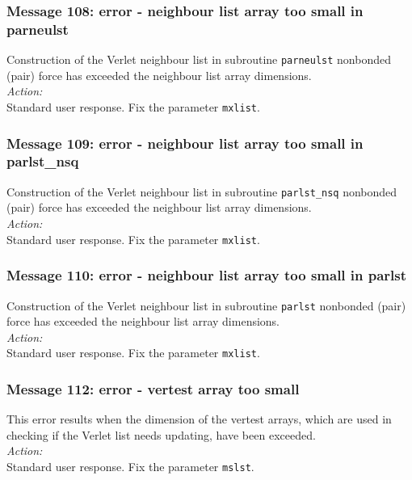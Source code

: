 \subsubsection*{Message 108: error - neighbour list array too small in
          parneulst}

Construction of the Verlet neighbour list 
in subroutine {\tt parneulst} nonbonded (pair) force has exceeded the
neighbour list array dimensions. \\

\noindent
{\em Action:} \\ 
Standard user response. Fix the parameter {\tt mxlist}.

\subsubsection*{Message 109: error - neighbour list array too small in
          parlst\_nsq}

Construction of the Verlet neighbour list 
in subroutine {\tt parlst\_nsq} nonbonded (pair) force has exceeded the
neighbour list array dimensions. \\

\noindent
{\em Action:} \\ 
Standard user response. Fix the parameter {\tt mxlist}.

\subsubsection*{Message 110: error - neighbour list array too small in
          parlst}

Construction of the Verlet neighbour list 
in subroutine {\tt parlst} nonbonded (pair) force has exceeded the
neighbour list array dimensions. \\

\noindent
{\em Action:} \\ 
Standard user response. Fix the parameter {\tt mxlist}.

\subsubsection*{Message 112: error - vertest array too small}

This error results when the dimension of the \D{} {\sc
vertest} arrays, which are used in checking if the Verlet list needs
updating, have been exceeded.\\

\noindent
{\em Action:} \\ 
Standard user response. Fix the parameter {\tt mslst}.


